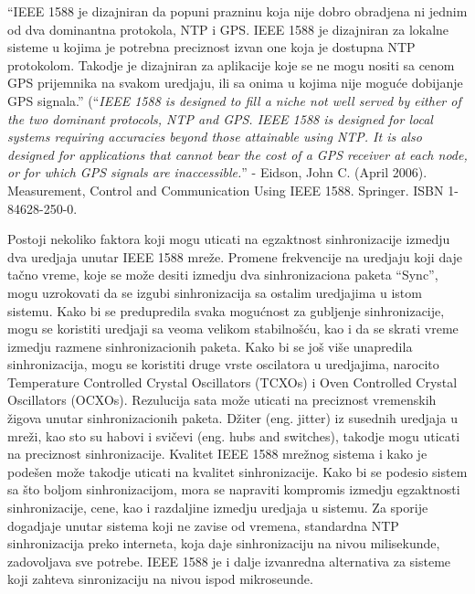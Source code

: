 \documentclass[a4paper,12pt, master]{etf}
\begin{document}
	``IEEE 1588 je dizajniran da popuni prazninu koja nije dobro obradjena ni
	jednim od dva dominantna protokola, NTP i GPS\@. IEEE 1588 je dizajniran za
	lokalne sisteme u kojima je	potrebna preciznost izvan one koja je dostupna
	NTP protokolom. Takodje je dizajniran za aplikacije koje se ne mogu nositi
	sa cenom GPS prijemnika na svakom uredjaju, ili sa onima u kojima nije
    mogu\'{c}e dobijanje GPS signala.'' (``\textit{IEEE 1588 is designed to fill a niche
	not well served by either of the two dominant protocols, NTP and GPS\@.
	IEEE 1588 is designed for local systems requiring accuracies beyond those
	attainable using NTP\@. It is also designed for applications that cannot
	bear the cost of a GPS receiver at each node, or for which GPS signals are
    inaccessible.}'' - Eidson, John C. (April 2006). Measurement, Control and
	Communication Using IEEE 1588. Springer. ISBN 1-84628-250-0.

	Postoji nekoliko faktora koji mogu uticati na egzaktnost sinhronizacije
	izmedju dva	uredjaja unutar IEEE 1588 mre\v{z}e. Promene frekvencije na
	uredjaju koji daje ta\v{c}no vreme,	koje se mo\v{z}e desiti izmedju dva
	sinhronizaciona paketa ``Sync'', mogu uzrokovati da se izgubi
	sinhronizacija sa ostalim uredjajima u istom sistemu. Kako bi se
	predupredila svaka mogu\'{c}nost za gubljenje sinhronizacije, mogu se
	koristiti uredjaji sa veoma velikom	stabilno\v{s}\'{c}u, kao i da se skrati
	vreme izmedju razmene sinhronizacionih paketa. Kako bi se jo\v{s} vi\v{s}e
	unapredila sinhronizacija, mogu se koristiti druge vrste oscilatora u
	uredjajima, narocito Temperature Controlled Crystal Oscillators (TCXOs) i
	Oven Controlled Crystal	Oscillators (OCXOs). Rezulucija sata mo\v{z}e
	uticati na preciznost vremenskih \v{z}igova unutar sinhronizacionih paketa.
	D\v{z}iter (eng\@. jitter) iz susednih uredjaja u mre\v{z}i, kao sto su habovi i
	svi\v{c}evi (eng\@. hubs and switches), takodje mogu uticati na preciznost
	sinhronizacije. Kvalitet IEEE 1588 mre\v{z}nog sistema i kako je
	pode\v{s}en mo\v{z}e takodje uticati na kvalitet sinhronizacije. Kako bi
	se podesio sistem sa \v{s}to boljom sinhronizacijom, mora se napraviti
	kompromis izmedju egzaktnosti sinhronizacije, cene, kao i razdaljine
	izmedju uredjaja u sistemu. Za sporije dogadjaje unutar sistema koji ne
	zavise od vremena, standardna NTP sinhronizacija preko interneta, koja daje
	sinhronizaciju na nivou milisekunde, zadovoljava sve potrebe. IEEE 1588 je
	i dalje izvanredna alternativa za sisteme koji zahteva sinronizaciju na
	nivou ispod	mikroseunde.
\end{document}
